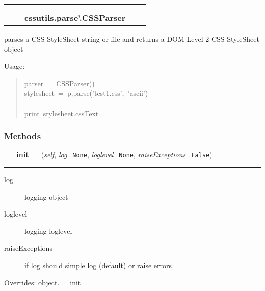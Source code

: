     \label{cssutils:parse':CSSParser}
\begin{tabular}{cccccc}
\multicolumn{2}{r}{\settowidth{\BCL}{object}\multirow{2}{\BCL}{object}}
&&
  \\\cline{3-3}
  &&\multicolumn{1}{c|}{}
&&
  \\
&&\multicolumn{2}{l}{\textbf{cssutils.parse'.CSSParser}}
\end{tabular}


parses a CSS StyleSheet string or file and
returns a DOM Level 2 CSS StyleSheet object

Usage:
\begin{quote}{\ttfamily \raggedright \noindent
parser~=~CSSParser()~\\
stylesheet~=~p.parse('test1.css',~'ascii')~\\
~\\
print~stylesheet.cssText
}\end{quote}


  \subsubsection{Methods}

    \vspace{0.5ex}

\hspace{.8\funcindent}\begin{boxedminipage}{\funcwidth}

    \raggedright \textbf{\_\_init\_\_}(\textit{self}, \textit{log}={\tt None}, \textit{loglevel}={\tt None}, \textit{raiseExceptions}={\tt False})

    \vspace{-1.5ex}

    \rule{\textwidth}{0.5\fboxrule}
\setlength{\parskip}{2ex}
\begin{description}
\item[{log}] \leavevmode 
logging object

\item[{loglevel}] \leavevmode 
logging loglevel

\item[{raiseExceptions}] \leavevmode 
if log should simple log (default) or raise errors

\end{description}
\setlength{\parskip}{1ex}
      Overrides: object.\_\_init\_\_

    \end{boxedminipage}

